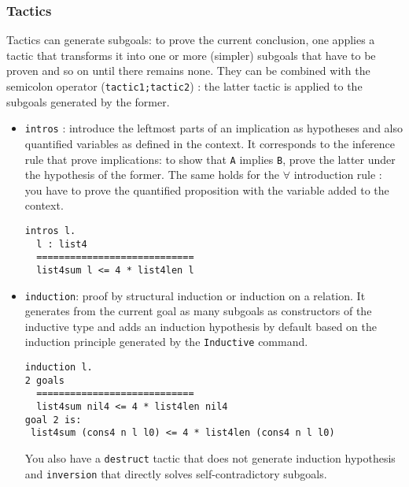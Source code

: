 \documentclass{article}
\begin{document}
        \subsubsection{Tactics}\label{Tactics}
        Tactics can generate subgoals: to prove the current conclusion, one applies a tactic that transforms it into one or more (simpler) subgoals that have to be proven and so on until there remains none. They can be combined with the semicolon operator (\texttt{tactic1;tactic2}) : the latter tactic is applied to the subgoals generated by the former.
        \begin{itemize}
            \item \texttt{intros} : introduce the leftmost parts of an implication as hypotheses and also quantified variables as defined in the context. It corresponds to the inference rule that prove implications: to show that \texttt{A} implies \texttt{B}, prove the latter under the hypothesis of the former. The same holds for the $\forall$ introduction rule : you have to prove the quantified proposition with the variable added to the context. 
            \begin{verbatim}intros l.
  l : list4
  ============================
  list4sum l <= 4 * list4len l\end{verbatim}
            \item \texttt{induction}: proof by structural induction or induction on a relation. It generates from the current goal as many subgoals as constructors of the inductive type and adds an induction hypothesis by default based on the induction principle generated by the \texttt{Inductive} command.
            \begin{verbatim}induction l.
2 goals
  ============================
  list4sum nil4 <= 4 * list4len nil4
goal 2 is:
 list4sum (cons4 n l l0) <= 4 * list4len (cons4 n l l0)\end{verbatim}
            You also have a \texttt{destruct} tactic that does not generate induction hypothesis and \texttt{inversion} that directly solves self-contradictory subgoals.
            

\end{itemize}
\end{document}
